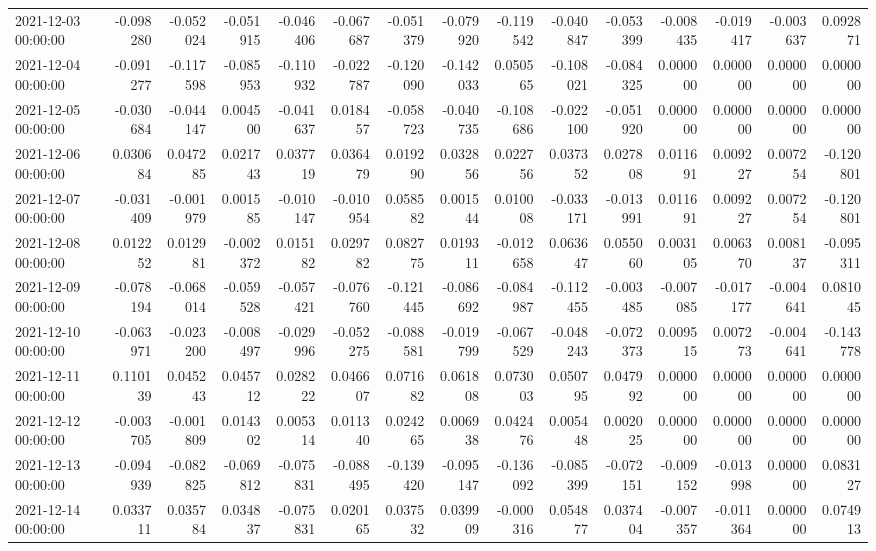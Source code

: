 \begin{tabular}{lrrrrrrrrrrrrrr}
2021-12-03 00:00:00 & -0.098280 & -0.052024 & -0.051915 & -0.046406 & -0.067687 & -0.051379 & -0.079920 & -0.119542 & -0.040847 & -0.053399 & -0.008435 & -0.019417 & -0.003637 & 0.092871 \\
2021-12-04 00:00:00 & -0.091277 & -0.117598 & -0.085953 & -0.110932 & -0.022787 & -0.120090 & -0.142033 & 0.050565 & -0.108021 & -0.084325 & 0.000000 & 0.000000 & 0.000000 & 0.000000 \\
2021-12-05 00:00:00 & -0.030684 & -0.044147 & 0.004500 & -0.041637 & 0.018457 & -0.058723 & -0.040735 & -0.108686 & -0.022100 & -0.051920 & 0.000000 & 0.000000 & 0.000000 & 0.000000 \\
2021-12-06 00:00:00 & 0.030684 & 0.047285 & 0.021743 & 0.037719 & 0.036479 & 0.019290 & 0.032856 & 0.022756 & 0.037352 & 0.027808 & 0.011691 & 0.009227 & 0.007254 & -0.120801 \\
2021-12-07 00:00:00 & -0.031409 & -0.001979 & 0.001585 & -0.010147 & -0.010954 & 0.058582 & 0.001544 & 0.010008 & -0.033171 & -0.013991 & 0.011691 & 0.009227 & 0.007254 & -0.120801 \\
2021-12-08 00:00:00 & 0.012252 & 0.012981 & -0.002372 & 0.015182 & 0.029782 & 0.082775 & 0.019311 & -0.012658 & 0.063647 & 0.055060 & 0.003105 & 0.006370 & 0.008137 & -0.095311 \\
2021-12-09 00:00:00 & -0.078194 & -0.068014 & -0.059528 & -0.057421 & -0.076760 & -0.121445 & -0.086692 & -0.084987 & -0.112455 & -0.003485 & -0.007085 & -0.017177 & -0.004641 & 0.081045 \\
2021-12-10 00:00:00 & -0.063971 & -0.023200 & -0.008497 & -0.029996 & -0.052275 & -0.088581 & -0.019799 & -0.067529 & -0.048243 & -0.072373 & 0.009515 & 0.007273 & -0.004641 & -0.143778 \\
2021-12-11 00:00:00 & 0.110139 & 0.045243 & 0.045712 & 0.028222 & 0.046607 & 0.071682 & 0.061808 & 0.073003 & 0.050795 & 0.047992 & 0.000000 & 0.000000 & 0.000000 & 0.000000 \\
2021-12-12 00:00:00 & -0.003705 & -0.001809 & 0.014302 & 0.005314 & 0.011340 & 0.024265 & 0.006938 & 0.042476 & 0.005448 & 0.002025 & 0.000000 & 0.000000 & 0.000000 & 0.000000 \\
2021-12-13 00:00:00 & -0.094939 & -0.082825 & -0.069812 & -0.075831 & -0.088495 & -0.139420 & -0.095147 & -0.136092 & -0.085399 & -0.072151 & -0.009152 & -0.013998 & 0.000000 & 0.083127 \\
2021-12-14 00:00:00 & 0.033711 & 0.035784 & 0.034837 & -0.075831 & 0.020165 & 0.037532 & 0.039909 & -0.000316 & 0.054877 & 0.037404 & -0.007357 & -0.011364 & 0.000000 & 0.074913 \\

\end{tabular}
